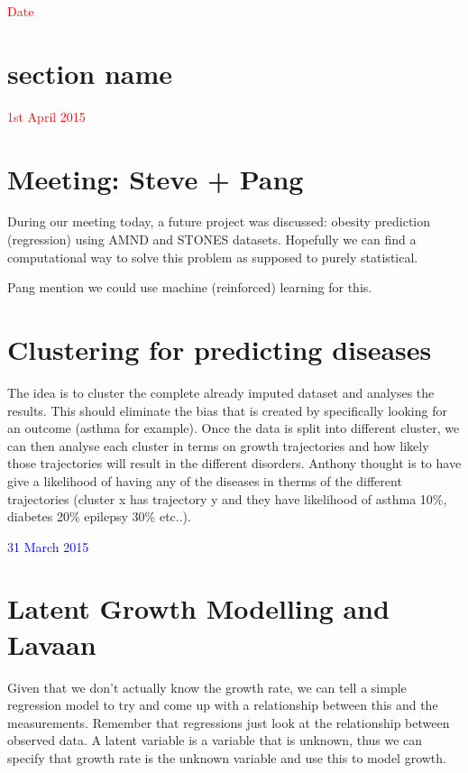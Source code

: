 \documentclass[12pt,letterpaper]{article}
\begin{document}
\univlogo


\textcolor{red}{\Huge Date}
\section*{section name} %
\label{sec:section_name}


\textcolor{red}{\Huge 1st April 2015}
\section{Meeting: Steve + Pang} %
\label{sec:meeting}
During our meeting today, a future project was discussed: obesity prediction (regression) using AMND and STONES datasets. Hopefully we can find a computational way to solve this problem as supposed to purely statistical. 

Pang mention we could use machine (reinforced) learning for this. 
\section{Clustering for predicting diseases} %
\label{sec:clustering_for_predicting_diseases}
The idea is to cluster the complete already imputed dataset and analyses the results. This should eliminate the bias that is created by specifically looking for an outcome (asthma for example). Once the data is split into different cluster, we can then analyse each cluster in terms on growth trajectories and how likely those trajectories will result in the different disorders. Anthony thought is to have give a likelihood of having any of the diseases in therms of the different trajectories (cluster x has trajectory y and they have likelihood of asthma 10\%, diabetes 20\% epilepsy 30\% etc..).

\textcolor{blue}{\Huge 31 March 2015}
\section*{Latent Growth Modelling and Lavaan} %
\label{sec:latent_growth}
Given that we don't actually know the growth rate, we can tell a simple regression model to try and come up with a relationship between this and the measurements. Remember that regressions just look at the relationship between observed data. A latent variable is a variable that is unknown, thus we can specify that growth rate is the unknown variable and use this to model growth. 
\end{document}
